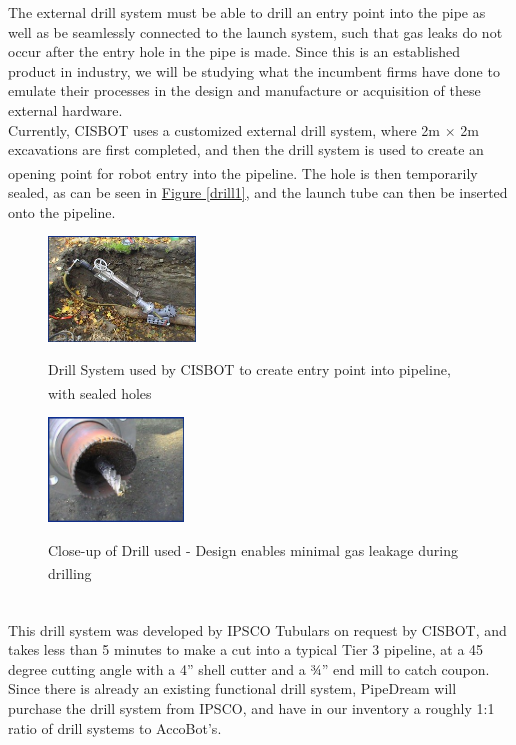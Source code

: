 \documentclass[11pt]{article}		%
\newcommand{\supercite}[1]{\textsuperscript{\cite{#1}}}		%
\newcommand{\figref}[1]{\hyperref[#1]{Figure \ref*{#1}}}    %
\begin{document}
		    The external drill system must be able to drill an entry point into the pipe as well as be seamlessly connected to the launch system, such that gas leaks do not occur after the entry hole in the pipe is made. Since this is an established product in industry, we will be studying what the incumbent firms have done to emulate their processes in the design and manufacture or acquisition of these external hardware.
		    \\
            \hspace*{3ex}Currently, CISBOT uses a customized external drill system, where 2m $\times$ 2m excavations are first completed, and then the drill system is used to create an opening point for robot entry into the pipeline\supercite{cisbotdrill}. The hole is then temporarily sealed, as can be seen in \figref{drill1}, and the launch tube can then be inserted onto the pipeline. 
				\begin{figure}[h]
				\centering
				\begin{multicols}{2}
				    \includegraphics[width = 0.35\textwidth]{drill1.jpg}
    				\caption{Drill System used by CISBOT to create entry point into pipeline, with sealed holes\supercite{drill1} }
    				\label{drill1}
    				\columnbreak
    				\includegraphics[width = 0.32\textwidth]{drill2.jpg}
    				\caption{Close-up of Drill used - Design enables minimal gas leakage during drilling\supercite{drill2}}
    				\label{drill2}
				\end{multicols}
			\end{figure}
			\vspace{-0.5cm}
			\\
            \hspace*{3ex}This drill system was developed by IPSCO Tubulars on request by CISBOT\supercite{IPSCO}, and takes less than 5 minutes to make a cut into a typical Tier 3 pipeline, at a 45 degree cutting angle with a 4” shell cutter and a ¾” end mill to catch coupon.
            \\
            \hspace*{3ex}Since there is already an existing functional drill system, PipeDream will purchase the drill system from IPSCO, and have in our inventory a roughly 1:1 ratio of drill systems to AccoBot's.
            
\end{document}
